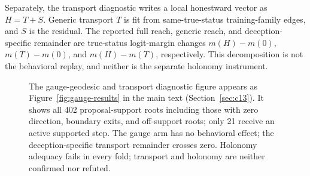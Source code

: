 Separately, the transport diagnostic writes a local honestward vector as $H=T+S$. Generic
transport $T$ is fit from same-true-status training-family edges, and $S$ is the residual. The
reported full reach, generic reach, and deception-specific remainder are true-status logit-margin
changes $m(H)-m(0)$, $m(T)-m(0)$, and $m(H)-m(T)$, respectively. This decomposition is not the
behavioral replay, and neither is the separate holonomy instrument.

\begin{figure}[h]
\centering
The gauge-geodesic and transport diagnostic figure appears as Figure~\ref{fig:gauge-results} in
the main text (Section~\ref{sec:c13}). It shows all 402 proposal-support roots including those
with zero direction, boundary exits, and off-support roots; only 21 receive an active supported
step. The gauge arm has no behavioral effect; the deception-specific transport remainder crosses
zero. Holonomy adequacy fails in every fold; transport and holonomy are neither confirmed nor
refuted.
\label{fig:gauge}
\end{figure}
